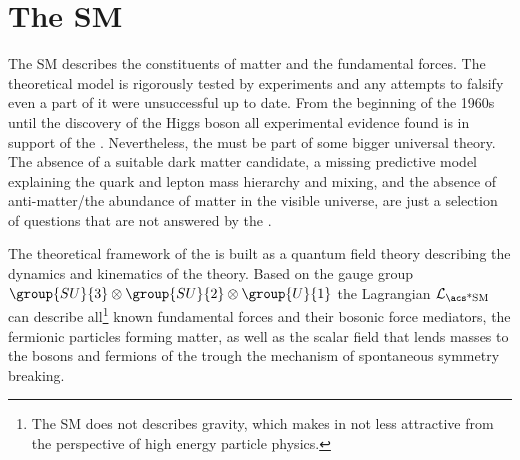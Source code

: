 
\section{The \acl*{SM}}
\label{sec:cpv_theory:standard_model}

The \acf{SM} describes the constituents of matter and the fundamental forces.
The theoretical model is rigorously tested by experiments and any attempts to
falsify even a part of it were unsuccessful up to date. From the beginning of
the 1960s until the discovery of the Higgs boson \cite{Aad:2015zhl} all
experimental evidence found is in support of the \SM. Nevertheless, the \SM must
be part of some bigger universal theory. The absence of a suitable dark matter
candidate, a missing predictive model explaining the quark and lepton mass
hierarchy and mixing, and the absence of anti-matter/the abundance of matter in
the visible universe, are just a selection of questions that are not answered by
the \SM.

The theoretical framework of the \SM is built as a quantum field theory
describing the dynamics and kinematics of the theory. Based on the gauge group
$\group{SU}{3}\otimes\group{SU}{2}\otimes\group{U}{1}$ the \SM Lagrangian
$\mathcal{L}_{\text{\acs*{SM}}}$ can describe all\footnote{The \ac{SM} does not
describes gravity, which makes in not less attractive from the perspective of
high energy particle physics.} known fundamental forces and their bosonic force
mediators, the fermionic particles forming matter, as well as the scalar field
that lends masses to the bosons and fermions of the \SM trough the mechanism of
spontaneous symmetry breaking.

